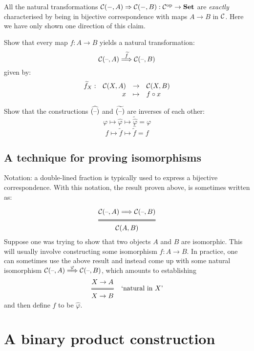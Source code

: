 All the natural transformations 
$\mathcal{C}(-,A)\Rightarrow\mathcal{C}(-,B):\mathcal{C}^{\mathrm{op}}\to\mathbf {Set}$ are
\textit{exactly} characterised by being in bijective correspondence with maps
$A \to B$ in $\mathcal{C}$. Here we have only shown one direction of this claim.

\begin{exercise}
Show that every map $f: A \to B$ yields a natural transformation:
\[ \mathcal{C} (\text{--}, A) \overset{\widetilde{f}}{\Longrightarrow} \mathcal{C} (\text{--}, B) \]
given by:
\[ \begin{array}{crcl}
    \widetilde{f}_X: & \mathcal{C} (X, A) & \to & \mathcal{C} (X, B) \\
    & x & \mapsto & f \circ x
\end{array} \]
\end{exercise}

\begin{exercise}
Show that the constructions $\widehat{(\text{--})}$ and $\widetilde{(\text{--})}$
are inverses of each other:
\[ \varphi \mapsto \widehat{\varphi} \mapsto \widetilde{\widehat{\varphi}} =
\varphi \]
\[ f \mapsto \widetilde{f} \mapsto \widehat{\widetilde{f}} = f \]
\end{exercise}

\subsection{A technique for proving isomorphisms}\label{subsec:proveiso}

Notation: a double-lined fraction is typically used to express a bijective
correspondence. With this notation, the result proven above, is sometimes
written as:

\[ 
  \Efrac
    {\lscat C (\phold, A) \natarrow \lscat C (\phold, B) }
    { \lscat C(A, B) }
\]

Suppose one was trying to show that two objects $A$ and $B$ are isomorphic.
This will usually involve constructing some isomorphism $ f : A \to B $.  In
practice, one can sometimes use the above result and instead come up with some
natural isomorphism $\mathcal{C} (\text{--}, A) \overset{\varphi}{\Longrightarrow} \mathcal{C} (\text{--},
B)$, which amounts to establishing 
\[
  \Efrac{X \to A}{X \to B} \quad\text{`natural in $X$'}
\]
and then define $f$ to be $\widehat{\varphi}$.

\section{A binary product construction}

